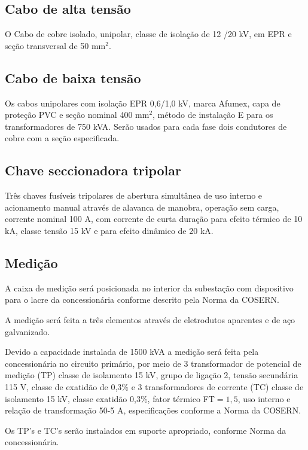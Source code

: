 \subsection{Cabo de alta tensão}
O Cabo de cobre isolado, unipolar, classe de isolação de 12 /20 kV, em EPR e seção transversal de
50 mm$^2$.
\subsection{Cabo de baixa tensão}
Os cabos unipolares com isolação EPR 0,6/1,0 kV, marca Afumex, capa de proteção PVC e seção nominal 400 mm$^2$, método de instalação E para os transformadores de 750 kVA.
Serão usados para cada fase dois condutores de cobre com a seção especificada.
\subsection{Chave seccionadora tripolar}
Três chaves fusíveis tripolares de abertura simultânea de uso interno e acionamento manual
através de alavanca de manobra, operação sem carga, corrente nominal 100 A, com corrente de curta
duração para efeito térmico de 10 kA, classe tensão 15 kV e para efeito dinâmico de 20 kA.
\subsection{Medição}
A caixa de medição será posicionada no interior da subestação com dispositivo para o lacre da concessionária conforme descrito pela Norma da COSERN.

A medição será feita a três elementos através de eletrodutos aparentes e de aço galvanizado.

Devido a capacidade instalada de 1500 kVA a medição será feita pela concessionária no circuito primário, por meio de 3 transformador de potencial de medição (TP) classe de isolamento 15 kV, grupo 
de ligação 2, tensão secundária 115 V, classe de exatidão de 0,3$\%$  e 3 transformadores de corrente (TC) classe de isolamento 15 kV, classe exatidão 0,3$\%$, fator térmico FT$=1,5$, uso interno e relação de transformação 50-5 A, especificações conforme a Norma da COSERN.

Os TP's e TC's serão instalados em suporte apropriado, conforme Norma da concessionária.


